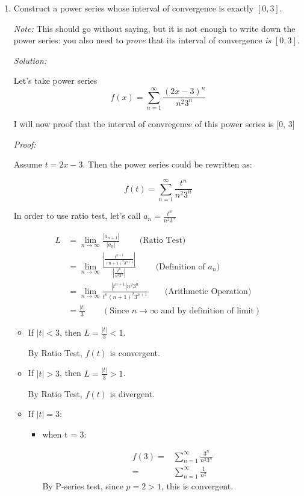 \documentclass[12pt]{exam}
\newcommand {\DS} [1] {${\displaystyle #1}$}
\begin{document}
\begin{enumerate}

\item Construct a power series whose interval of convergence is exactly \DS{[0,3]}. 

\emph{Note:}  This should go without saying, but it is not enough to write down the power series: you also need to \emph{prove} that its interval of convergence \emph{is} \DS{[0,3].}

\emph{Solution:}

Let's take power series $$f(x) = \sum_{n = 1}^{\infty} \frac{(2x-3)^n}{n^2 3^n}$$

I will now proof that the interval of convregence of this power series is [0, 3]

\emph{Proof:}

Assume $t = 2x - 3$. Then the power series could be rewritten as:

$$f(t) = \sum_{n = 1}^{\infty} \frac{t^n}{n^2 3^n}$$

In order to use ratio test, let's call $a_n =  \frac{t^n}{n^2 3^n}$

\begin{align*}
	L &= \lim_{n \to \infty} \frac{|a_{n + 1}|}{|a_n|} \qquad\mbox{ (Ratio Test) } \\
	&= \lim_{n \to \infty} \frac{|\frac{t^{n + 1}}{(n + 1)^2 3^{n + 1}}|}{|\frac{t^n}{n^2 3^n}|} \qquad\mbox{ (Definition of } a_n ) \\
	&= \lim_{n \to \infty} \frac{|t^{n + 1}| n^2 3^n}{ t^n(n + 1)^2 3^{n + 1}} \qquad\mbox{(Arithmetic Operation)} \\
	&= \frac{|t|}{3} \qquad( \mbox{Since } n \to \infty \mbox{ and by definition of limit})
\end{align*}

\begin{itemize}
	\item If $|t| < 3$, then $L = \frac{|t|}{3} < 1$.

	By Ratio Test, $f(t)$ is convergent.

	\item If $|t| > 3$, then $L = \frac{|t|}{3} > 1$.

	By Ratio Test, $f(t)$ is divergent.

	\item If $|t| = 3$:

	\begin{itemize}
		\item when t = 3:

		\begin{align*}
			f(3) 
			=& \sum_{n = 1}^{\infty} \frac{3^n}{n^2 3^n} \\
			=& \sum_{n = 1}^{\infty} \frac{1}{n^2}
		\end{align*}
		By P-series test, since $p=2 > 1$, this is convergent.
		

\end{itemize}
\end{itemize}
\end{enumerate}
\end{document}

